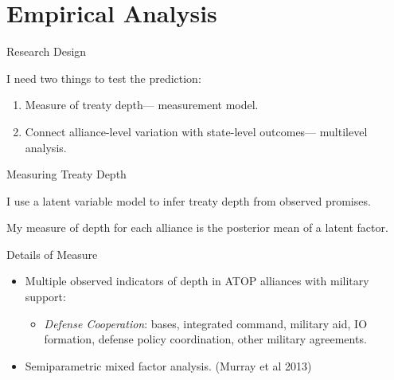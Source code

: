 \documentclass[12pt]{beamer}
\begin{document}
\section{Empirical Analysis} 


\begin{frame}{Research Design}

I need two things to test the prediction: 

\pause 
\begin{enumerate} 
\item Measure of treaty depth--- measurement model. 
\pause
\item Connect alliance-level variation with state-level outcomes--- multilevel analysis.  
\end{enumerate} 


\end{frame}


\begin{frame}{Measuring Treaty Depth}

I use a latent variable model to infer treaty depth from observed promises. 

\pause 

My measure of depth for each alliance is the posterior mean of a latent factor. 

\end{frame} 


\begin{frame}{Details of Measure}
 
\begin{itemize}
\item Multiple observed indicators of depth in ATOP alliances with military support: 
\begin{itemize} 
\item \textit{Defense Cooperation}: bases, integrated command, military aid, IO formation, defense policy coordination, other military agreements. 
\end{itemize} 
\pause 
\item Semiparametric mixed factor analysis. (Murray et al 2013)
\end{itemize} 


\end{frame} 

\end{document}
